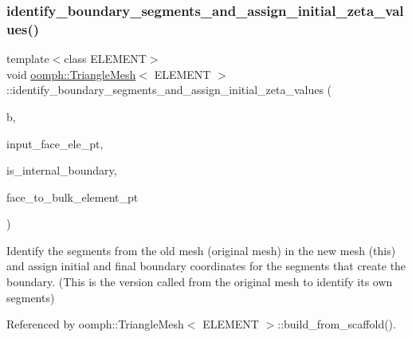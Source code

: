\mbox{\label{classoomph_1_1TriangleMesh_ad71f798646dfcbe8baa991e540381cde}} 
\subsubsection{\texorpdfstring{identify\+\_\+boundary\+\_\+segments\+\_\+and\+\_\+assign\+\_\+initial\+\_\+zeta\+\_\+values()}{identify\_boundary\_segments\_and\_assign\_initial\_zeta\_values()}\hspace{0.1cm}{\footnotesize\ttfamily [1/2]}}
{\footnotesize\ttfamily template$<$class E\+L\+E\+M\+E\+NT$>$ \\
void \hyperlink{classoomph_1_1TriangleMesh}{oomph\+::\+Triangle\+Mesh}$<$ E\+L\+E\+M\+E\+NT $>$\+::identify\+\_\+boundary\+\_\+segments\+\_\+and\+\_\+assign\+\_\+initial\+\_\+zeta\+\_\+values (\begin{DoxyParamCaption}\item[{const unsigned \&}]{b,  }\item[{\hyperlink{classoomph_1_1Vector}{Vector}$<$ \hyperlink{classoomph_1_1FiniteElement}{Finite\+Element} $\ast$$>$ \&}]{input\+\_\+face\+\_\+ele\+\_\+pt,  }\item[{const bool \&}]{is\+\_\+internal\+\_\+boundary,  }\item[{std\+::map$<$ \hyperlink{classoomph_1_1FiniteElement}{Finite\+Element} $\ast$, \hyperlink{classoomph_1_1FiniteElement}{Finite\+Element} $\ast$$>$ \&}]{face\+\_\+to\+\_\+bulk\+\_\+element\+\_\+pt }\end{DoxyParamCaption})}



Identify the segments from the old mesh (original mesh) in the new mesh (this) and assign initial and final boundary coordinates for the segments that create the boundary. (This is the version called from the original mesh to identify its own segments) 



Referenced by oomph\+::\+Triangle\+Mesh$<$ E\+L\+E\+M\+E\+N\+T $>$\+::build\+\_\+from\+\_\+scaffold().

